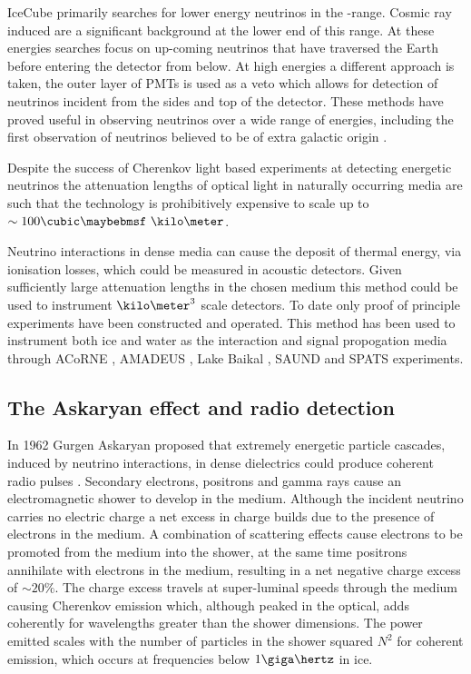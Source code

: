 IceCube primarily searches for lower energy neutrinos in the \TeV-\PeV range. Cosmic ray induced \Pmu are a significant background at the lower end of this range. At these energies searches focus on up-coming neutrinos that have traversed the Earth before entering the detector from below. At high energies a different approach is taken, the outer layer of PMTs is used as a veto which allows for detection of neutrinos incident from the sides and top of the detector. These methods have proved useful in observing neutrinos over a wide range of energies, including the first observation of neutrinos believed to be of extra galactic origin \cite{PhysRevLett.111.021103}.

Despite the success of Cherenkov light based experiments at detecting energetic neutrinos the attenuation lengths of optical light in naturally occurring media are such that the technology is prohibitively expensive to scale up to $\sim 100 \cubic\km$. 

Neutrino interactions in dense media can cause the deposit of thermal energy, via ionisation losses, which could be measured in acoustic detectors. Given sufficiently large attenuation lengths in the chosen medium this method could be used to instrument $\kilo \meter ^{3}$ scale detectors. To date only proof of principle experiments have been constructed and operated. This method has been used to instrument both ice and water as the interaction and signal propogation media through ACoRNE \cite{1742-6596-81-1-012011}, AMADEUS \cite{Lahmann2009S158}, Lake Baikal \cite{2009arXiv0910.0678A}, SAUND \cite{Kurahashi:2010ei} and SPATS \cite{Boeser:2008bj} experiments.



\subsection{The Askaryan effect and radio detection}
\label{sec:uhe-app:UHEN:Askaryan}

In 1962 Gurgen Askaryan proposed that extremely energetic particle cascades, induced by neutrino interactions, in dense dielectrics could produce coherent radio pulses \cite{Askaryan1965} \cite{Askaryan1962}. Secondary electrons, positrons and gamma rays cause an electromagnetic shower to develop in the medium. Although the incident neutrino carries no electric charge a net excess in charge builds due to the presence of electrons in the medium. A combination of scattering effects cause electrons to be promoted from the medium into the shower, at the same time positrons annihilate with electrons in the medium, resulting in a net negative charge excess of $\sim 20\%$. The charge excess travels at super-luminal speeds through the medium causing Cherenkov emission which, although peaked in the optical, adds coherently for wavelengths greater than the shower dimensions. The power emitted scales with the number of particles in the shower squared $N^{2}$ for coherent emission, which occurs at frequencies below $1\giga \hertz$ in ice. 

